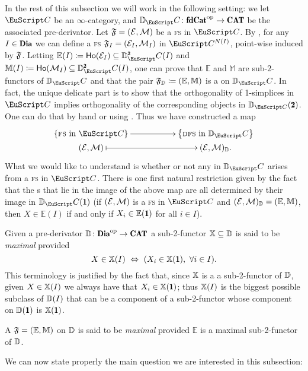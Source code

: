 In the rest of this subsection we will work in the following setting: we let $\iC$ be an $\infty$-category, and $\D_\iC\colon \fincat^\opp\to \Cat$ be the associated pre-derivator. Let $\mathfrak{F}=(\mathcal{E},\mathcal{M})$ be a \textsc{fs} in $\iC$. By \cite[§\textbf{24.10}]{joyal2008notes}, for any $I\in \Dia$ we can define a \textsc{fs} $\mathfrak{F}_I=(\mathcal{E}_I,\mathcal{M}_I)$ in $\iC^{N(I)}$, point-wise induced by $\mathfrak{F}$. Letting $\mathbb E(I) \coloneqq \ho(\E_I)\subseteq \D^\due_\iC(I)$ and $\mathbb M(I) \coloneqq \ho(\M_I)\subseteq \D^\due_\iC(I)$, one can prove that $\mathbb E$ and $\mathbb M$ are sub-$2$-functors of $\D_\iC$ and that the pair $\mathfrak{F}_{\mathbb{D}} \coloneqq (\mathbb E,\mathbb M)$ is a \dpfs on $\D_\iC$. In fact, the unique delicate part is to show that the orthogonality of 1-simplices in $\iC$ implies orthogonality of the corresponding objects in $\D_{\iC}(\due)$. One can do that by hand or using \cite[Lem. \textbf{5.2.8.22}]{HTT}. 
Thus we have constructed a map 
\begin{equation}\label{the_map}
\xymatrix@R=0pt{
\left\{\text{\textsc{fs} in $\iC$}\right\}\ar@{->}[rr]&&\left\{\text{\dfs in $\D_\iC$}\right\}\\
(\E,\M)\ar@{|->}[rr]&&(\E,\M)_\D.
}
\end{equation}
What we would like to understand is whether or not any \dfs in $\D_\iC$ arises from a \textsc{fs} in $\iC$. There is one first natural restriction given by the fact that the {\dfs}s that lie in the image of the above map are all determined by their image in $\D_\iC(\uno)$ (\ie if $(\mathcal{E},\mathcal{M})$ is a \textsc{fs} in $\iC$ and $(\mathcal{E},\mathcal{M})_{\mathbb{D}}=(\mathbb E,\mathbb M)$, then $X\in \mathbb E(I)$ if and only if $X_i\in \mathbb E(\uno)$ for all $i\in I$).

\begin{definition}\label{maximal-sub}
Given a pre-derivator $\D\colon \Dia^\opp\to \Cat$ a sub-2-functor $\mathbb{X}\subseteq \mathbb{D}$ is said to be \emph{maximal} provided 
\[
X\in \X(I)\ \Leftrightarrow \ (X_i\in \X(\uno),\ \forall i\in I).
\]
This terminology is justified by the fact that, since $\mathbb{X}$ is a a sub-2-functor of $\mathbb{D}$, given $X\in \mathbb{X}(I)$ we always have that $X_i\in \X(\uno)$; thus $\mathbb{X}(I)$ is the biggest possible subclass of $\mathbb{D}(I)$ that can be a component of a sub-2-functor whose component on $\D(\uno)$ is $\X(\uno)$.

A \dfs $\mathfrak{F}=(\mathbb E,\mathbb M)$ on $\mathbb{D}$ is said to be \emph{maximal} provided $\mathbb E$ is a maximal sub-2-functor of $\mathbb{D}$. 
\end{definition}

We can now state properly the main question we are interested in this subsection:

